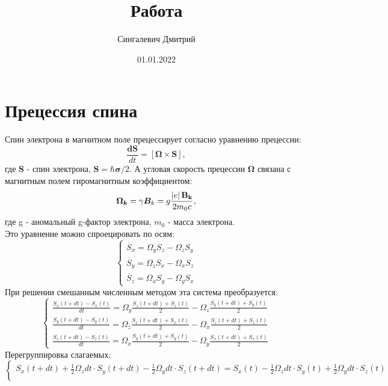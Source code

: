 \documentclass[12pt,oneside]{book}
\begin{document}
\title{Работа}
\author{Сингалевич Дмитрий}
\date{01.01.2022}
\maketitle

\section{Прецессия спина}
	
	{Спин электрона в магнитном поле прецессирует согласно уравнению прецессии:\\
	\begin{equation}
		\label{Bloh}
		\frac{\bm {dS}}{dt} = [ \bm \Omega \times \bm{S}] ,
	\end{equation}
	где $ \bm{S}$ - спин электрона, $\bm{S}=\hbar\bm{\sigma}/2$.	
	А угловая скорость прецессии $\bm \Omega$ связана с магнитным полем гиромагнитным коэффициентом:
	\begin{equation}
		\label{Effective} 
		{\bm{\Omega _k}} = \gamma{{\bm{B}}_k} = g\frac{{\left| e \right|{{\bf{B}}_{\bf{k}}}}}{{2{m_0}c}}  ,
	\end{equation}
	где g - аномальный g-фактор электрона, ${m_0}$ - масса электрона.
	\\
	Это уравнение можно спроецировать по осям:
	$$\begin{cases}
		\Dot{S_x} = \Omega_y{S_z} - \Omega_z{S_y} \\
		\Dot{S_y} = \Omega_z{S_x} - \Omega_x{S_z} \\
		\Dot{S_z} = \Omega_x{S_y} - \Omega_y{S_x}
	\end{cases}$$
	При решении смешанным численным методом эта система преобразуется:
	$$\begin{cases}
		\frac{S_x(t+dt) - S_x(t)}{dt} = \Omega_y\frac{S_z(t+dt) + S_z(t)}{2} - \Omega_z\frac{S_y(t+dt) + S_y(t)}{2} \\
		\frac{S_y(t+dt) - S_y(t)}{dt} = \Omega_z\frac{S_x(t+dt) + S_x(t)}{2} - \Omega_x\frac{S_z(t+dt) + S_z(t)}{2} \\
		\frac{S_z(t+dt) - S_z(t)}{dt} = \Omega_x\frac{S_y(t+dt) + S_y(t)}{2} - \Omega_y\frac{S_x(t+dt) + S_x(t)}{2}
	\end{cases}$$
	Перегруппировка слагаемых: 
	$$\begin{cases}
		{S_x(t+dt)}+{{\frac{1}{2}\Omega_z{dt}}\cdot{S_y(t+dt)}}-{{\frac{1}{2}\Omega_y{dt}}\cdot{S_z(t+dt)}} = {S_x(t)} - {\frac{1}{2}\Omega_z{dt}}\cdot{S_y(t)} + {\frac{1}{2}\Omega_y{dt}}\cdot{S_z(t)} \\

\end{cases}$$}
\end{document}
